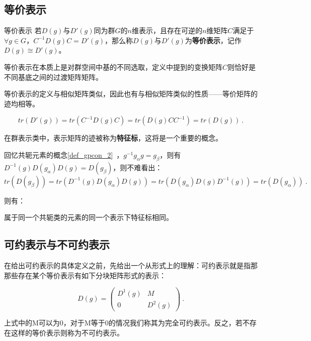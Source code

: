 


\subsection{等价表示}
\begin{definition}{等价表示}
若$D(g)$与$D'(g)$同为群$G$的$n$维表示，且存在可逆的$n$维矩阵$C$满足于$\forall g\in G$，$C^{-1}D(g)C=D'(g)$，那么称$D(g)$与$D'(g)$为\textbf{等价表示}，记作$D(g)\cong D'(g)$。
\end{definition}

等价表示在本质上是对群空间中基的不同选取，定义中提到的变换矩阵$C$则恰好是不同基底之间的过渡矩阵矩阵。

等价表示的定义与相似矩阵类似，因此也有与相似矩阵类似的性质——等价矩阵的迹均相等。

$$tr(D'(g))=tr(C^{-1}D(g)C)=tr(D(g)CC^{-1})=tr(D(g))~.$$

在群表示类中，表示矩阵的迹被称为\textbf{特征标}，这将是一个重要的概念。

回忆共轭元素的概念\autoref{def_gpcon_2}~，$g^{-1}g_\alpha g=g_\beta$，则有$D^{-1}(g)D(g_\alpha)D(g)=D(g_\beta)$，则不难看出：
$$tr(D(g_\beta))=tr(D^{-1}(g)D(g_\alpha)D(g))=tr(D(g_\alpha)D(g)D^{-1}(g))=tr(D(g_\alpha))~.$$

则有：
\begin{corollary}{}
属于同一个共轭类的元素的同一个表示下特征标相同。
\end{corollary}



\subsection{可约表示与不可约表示}

在给出可约表示的具体定义之前，先给出一个从形式上的理解：可约表示就是指那那些存在某个等价表示有如下分块矩阵形式的表示：

\begin{equation}
D(g)=\begin{pmatrix}
 D^1(g) & M\\
 0 & D^2(g)
\end{pmatrix}~.
\end{equation}

上式中的M可以为0，对于M等于0的情况我们称其为完全可约表示。反之，若不存在这样的等价表示则称为不可约表示。

